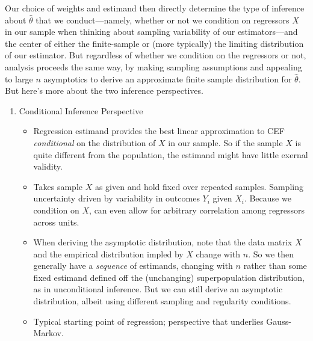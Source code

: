 \documentclass[12pt]{article}
\theoremstyle{plain}
\theoremstyle{definition}
\theoremstyle{remark}
\begin{document}
\begin{enumerate}
    Our choice of weights and estimand then directly determine the type
    of inference about $\hat{\theta}$ that we conduct---namely,
    whether or not we condition on regressors $X$ in our
    sample when thinking about sampling variability of our
    estimators---and the center of either the finite-sample or (more
    typically) the limiting distribution of our estimator.
    But regardless of whether we condition on the regressors or not,
    analysis proceeds the same way, by making sampling assumptions and
    appealing to large $n$ asymptotics to derive an approximate finite
    sample distribution for $\hat{\theta}$.
    But here's more about the two inference perspectives.
    \begin{enumerate}[label=(\alph*)]
      \item Conditional Inference Perspective
        \begin{itemize}
          \item Regression estimand provides the best linear
            approximation to CEF \emph{conditional} on the distribution
            of $X$ in our sample.
            So if the sample $X$ is quite different from the population,
            the estimand might have little exernal validity.

          \item Takes sample $X$ as given and hold fixed over repeated
            samples.
            Sampling uncertainty driven by variability in outcomes
            $Y_i$ given $X_i$.
            Because we condition on $X$, can even allow for arbitrary
            correlation among regressors across units.

          \item
            When deriving the asymptotic distribution, note that the
            data matrix $X$ and the empirical distribution impled by $X$
            change with $n$.
            So we then generally have a \emph{sequence}
            of estimands, changing with $n$ rather than some fixed
            estimand defined off the (unchanging) superpopulation
            distribution, as in unconditional inference.
            But we can still derive an asymptotic distribution, albeit
            using different sampling and regularity conditions.

          \item Typical starting point of regression; perspective
            that underlies Gauss-Markov.

        \end{itemize}


\end{enumerate}
\end{enumerate}
\end{document}

